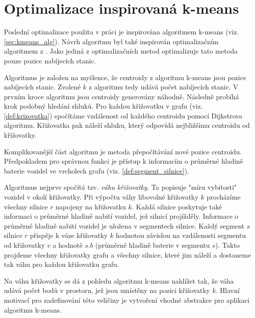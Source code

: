 \section{Optimalizace inspirovaná k-means}
\label{sec:kmeans_optim}

Poslední optimalizace použita v práci je inspirována algoritmem k-means 
(viz. \cref{sec:kmeans_alg}). Návrh algoritmu byl také inspirován optimalizačním
algoritmem z \citet{kmeans_layout}. Jako jediná z optimalizačních metod optimalizuje
tato metoda pouze pozice nabíjecích stanic.

Algoritmus je založen na myšlence, že centroidy z algoritmu k-means jsou pozice
nabíjecích stanic. Zvolené $k$ z algoritmu tedy udává počet nabíjecích stanic.
V prvním kroce algoritmu jsou centroidy generovány náhodně.
Následně probíhá krok podobný hledání shluků. Pro každou křižovatku v grafu 
(viz. \cref{def:krizovatka}) spočítáme vzdálenost od každého centroidu pomocí
Dijkstrova algoritmu. Křižovatka pak náleží shluku, který odpovídá nejbližšímu
centroidu od křižovatky.

Komplikovanější část algoritmu je metoda přepočítávání nové pozice centroidu. 
Předpokladem pro správnou funkci je přístup k informacím o průměrné hladině
baterie vozidel ve vrcholech grafu (viz. \cref{def:segment_silnice}). 

Algoritmus nejprve spočítá tzv. \emph{váhu křižovatky}. Ta popisuje "míru vybitosti"
vozidel v okolí křižovatky. Při výpočtu váhy libovolné křižovatky 
$k$ procházíme všechny silnice $r$ napojeny na křižovatku $k$. 
Každá silnice poskytuje také informaci o průměrné hladině nabití vozidel,
jež silnicí projížděly. Informace o průměrné hladině nabití vozidel je uložena
v segmentech silnice. Každý segment $s$ silnice $r$ přispěje k váze křižovatky 
$k$ hodnotou závislou na vzdálenosti segmentu od křižovatky $v$ 
a hodnotě $s.b$ (průměrné hladině baterie v segmentu $s$). Takto projdeme 
všechny křižovatky grafu a všechny silnice, které jim náleží a dostaneme tak váhu
pro každou křižovatku grafu. 

Na váhu křižovatky se dá z pohledu algoritmu k-means nahlížet tak, že váha 
udává počet bodů v prostoru, jež jsou umístěny na pozici křižovatky $k$. 
Hlavní motivací pro zadefinování této veličiny je vytvoření vhodné abstrakce
pro aplikaci algoritmu k-means.



